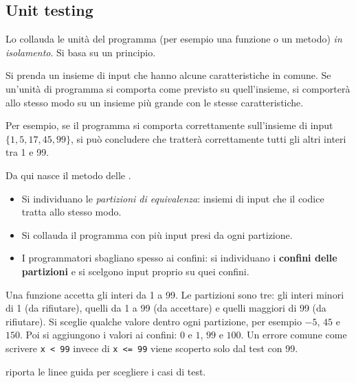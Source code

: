 \subsection{Unit testing}
\label{sec:test-unit}

Lo  collauda le unità del programma (per esempio una funzione o un metodo) \emph{in
isolamento}. Si basa su un principio.

\begin{idea}
Si prenda un insieme di input che hanno alcune caratteristiche in comune. Se un'unità di programma si comporta come
previsto su quell'insieme, si comporterà allo stesso modo su un insieme più grande con le stesse caratteristiche.
\end{idea}

Per esempio, se il programma si comporta correttamente sull'insieme di input $\{1, 5, 17, 45, 99\}$, si può concludere
che tratterà correttamente tutti gli altri interi tra 1 e 99.

Da qui nasce il metodo delle .
\begin{itemize}
  \item Si individuano le \emph{partizioni di equivalenza}: insiemi di input che il codice tratta allo stesso modo.
  \item Si collauda il programma con più input presi da ogni partizione.
  \item I programmatori sbagliano spesso ai confini: si individuano i \textbf{confini delle partizioni} e si scelgono
    input proprio su quei confini.
\end{itemize}

\begin{esempio}
Una funzione accetta gli interi da 1 a 99. Le partizioni sono tre: gli interi minori di 1 (da rifiutare), quelli da 1
a 99 (da accettare) e quelli maggiori di 99 (da rifiutare). Si sceglie qualche valore dentro ogni partizione, per
esempio $-5$, $45$ e $150$. Poi si aggiungono i valori ai confini: $0$ e $1$, $99$ e $100$. Un errore comune come
scrivere \texttt{x < 99} invece di \texttt{x <= 99} viene scoperto solo dal test con 99.
\end{esempio}

 riporta le linee guida per scegliere i casi di test.

